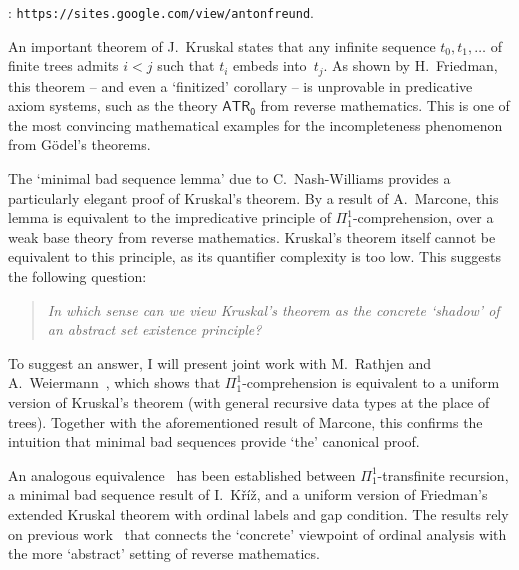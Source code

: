 \documentclass[bsl,meeting]{asl}
\def\urladdr#1{\endgraf\noindent{\it URL Address}: {\tt #1}.}
\newcommand{\NP}{}
\begin{document}
\thispagestyle{empty}

\NP%
%
%
%
%
\urladdr{https://sites.google.com/view/antonfreund}


An important theorem of J.~Kruskal states that any infinite sequence $t_0,t_1,\ldots$ of finite trees admits $i<j$ such that $t_i$ embeds into~$t_j$. As shown by H.~Friedman, this theorem -- and even a `finitized' corollary -- is unprovable in predicative axiom systems, such as the theory $\mathsf{ATR_0}$ from reverse mathematics. This is one of the most convincing mathematical examples for the incompleteness phenomenon from G\"odel's theorems.

The `minimal bad sequence lemma' due to C.~Nash-Williams provides a particularly elegant proof of Kruskal's theorem. By a result of A.~Marcone, this lemma is equivalent to the impredicative principle of $\Pi^1_1$-comprehension, over a weak base theory from reverse mathematics. Kruskal's theorem itself cannot be equivalent to this principle, as its quantifier complexity is too low. This suggests the following question:
\begin{quote}
\emph{In which sense can we view Kruskal's theorem as the concrete `shadow' of an abstract set existence principle?}
\end{quote}

To suggest an answer, I will present joint work with M.~Rathjen and A.~Weiermann~\cite{FRW_Kruskal}, which shows that $\Pi^1_1$-comprehension is equivalent to a uniform version of Kruskal's theorem (with general recursive data types at the place of trees). Together with the aforementioned result of Marcone, this confirms the intuition that minimal bad sequences provide `the' canonical proof.

An analogous equivalence~\cite{Freund_Kruskal-Friedman} has been established between $\Pi^1_1$-transfinite recursion, a minimal bad sequence result of I.~K\v{r}\'{i}\v{z}, and a uniform version of Friedman's extended Kruskal theorem with ordinal labels and gap condition. The results rely on previous work~\cite{Freund_Rel-Bachmann,Freund-Rathjen_TR} that connects the `concrete' viewpoint of ordinal analysis with the more `abstract' setting of reverse mathematics.
\end{document}
